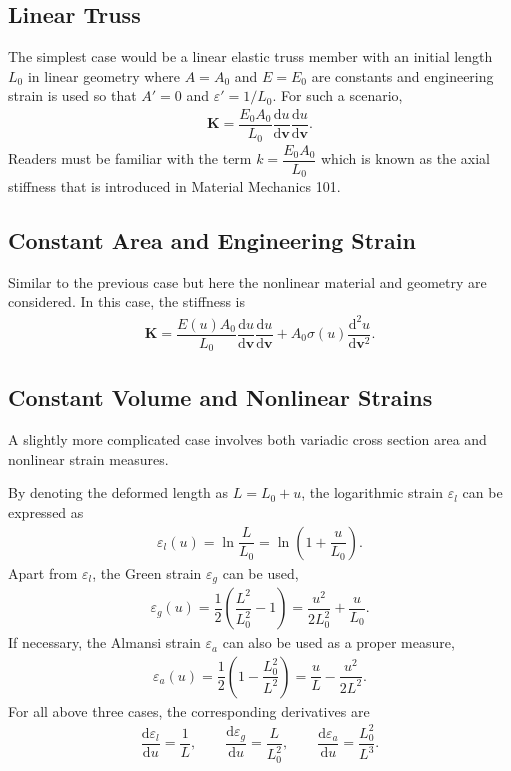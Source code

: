 \documentclass[11pt]{article}
\begin{document}
\subsection{Linear Truss}
The simplest case would be a linear elastic truss member with an initial length $L_0$ in linear geometry where $A=A_0$ and $E=E_0$ are constants and engineering strain is used so that $A'=0$ and $\varepsilon'=1/L_0$. For such a scenario,
\begin{gather}
\mathbf{K}=\dfrac{E_0A_0}{L_0}\dfrac{\mathrm{d}u}{\mathrm{d}\mathbf{v}}\dfrac{\mathrm{d}u}{\mathrm{d}\mathbf{v}}.
\end{gather}
Readers must be familiar with the term $k=\dfrac{E_0A_0}{L_0}$ which is known as the axial stiffness that is introduced in Material Mechanics \num{101}.
\subsection{Constant Area and Engineering Strain}
Similar to the previous case but here the nonlinear material and geometry are considered. In this case, the stiffness is
\begin{gather}
\mathbf{K}=\dfrac{E(u)A_0}{L_0}\dfrac{\mathrm{d}u}{\mathrm{d}\mathbf{v}}\dfrac{\mathrm{d}u}{\mathrm{d}\mathbf{v}}+A_0\sigma(u)\dfrac{\mathrm{d}^2u}{\mathrm{d}\mathbf{v}^2}.
\end{gather}
\subsection{Constant Volume and Nonlinear Strains}
A slightly more complicated case involves both variadic cross section area and nonlinear strain measures.

By denoting the deformed length as $L=L_0+u$, the logarithmic strain $\varepsilon_l$ can be expressed as
\begin{gather}
\varepsilon_l(u)=\ln\dfrac{L}{L_0}=\ln\left(1+\dfrac{u}{L_0}\right).
\end{gather}
Apart from $\varepsilon_l$, the Green strain $\varepsilon_g$ can be used,
\begin{gather}
\varepsilon_g(u)=\dfrac{1}{2}\left(\dfrac{L^2}{L_0^2}-1\right)=\dfrac{u^2}{2L_0^2}+\dfrac{u}{L_0}.
\end{gather}
If necessary, the Almansi strain $\varepsilon_a$ can also be used as a proper measure,
\begin{gather}
\varepsilon_a(u)=\dfrac{1}{2}\left(1-\dfrac{L_0^2}{L^2}\right)=\dfrac{u}{L}-\dfrac{u^2}{2L^2}.
\end{gather}
For all above three cases, the corresponding derivatives are
\begin{gather}
\dfrac{\mathrm{d}\varepsilon_l}{\mathrm{d}u}=\dfrac{1}{L},\qquad\dfrac{\mathrm{d}\varepsilon_g}{\mathrm{d}u}=\dfrac{L}{L_0^2},\qquad\dfrac{\mathrm{d}\varepsilon_a}{\mathrm{d}u}=\dfrac{L_0^2}{L^3}.
\end{gather}
\end{document}
